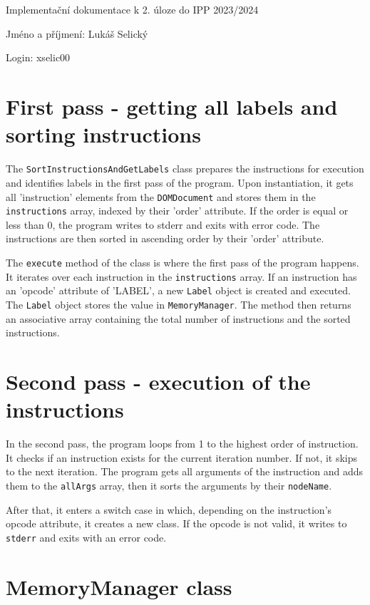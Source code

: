 \documentclass[10pt,a4paper]{article}
\begin{document}
\section*{}
\noindent
Implementační dokumentace k 2. úloze do IPP 2023/2024

\noindent
Jméno a příjmení: Lukáš Selický

\noindent
Login: xselic00


\section*{First pass - getting all labels and sorting instructions}
The \texttt{SortInstructionsAndGetLabels} class prepares the instructions for execution and identifies labels in the first pass of the program.
Upon instantiation, it gets all 'instruction' elements from the \texttt{DOMDocument} and stores them in the \texttt{instructions} array, indexed by their 'order' attribute. If the order is equal or less than 0, the program writes to stderr and exits with error code. The instructions are then sorted in ascending order by their 'order' attribute.

The \texttt{execute} method of the class is where the first pass of the program happens. It iterates over each instruction in the \texttt{instructions} array. If an instruction has an 'opcode' attribute of 'LABEL', a new \texttt{Label} object is created and executed. The \texttt{Label} object stores the value in \texttt{MemoryManager}. The method then returns an associative array containing the total number of instructions and the sorted instructions.

\section*{Second pass - execution of the instructions}
In the second pass, the program loops from 1 to the highest order of instruction. It checks if an instruction exists for the current iteration number. If not, it skips to the next iteration. The program gets all arguments of the instruction and adds them to the \texttt{allArgs} array, then it sorts the arguments by their \texttt{nodeName}.

After that, it enters a switch case in which, depending on the instruction's opcode attribute, it creates a new class. If the opcode is not valid, it writes to \texttt{stderr} and exits with an error code.

\section*{MemoryManager class}
\end{document}
